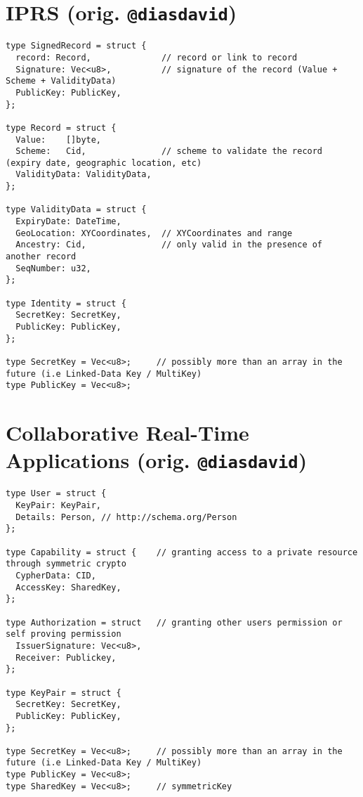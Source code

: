 \documentclass[11pt]{article}
\begin{document}
\newpage
\section{IPRS (orig. \texttt{@diasdavid})}

\begin{lstlisting}
type SignedRecord = struct {
  record: Record,              // record or link to record
  Signature: Vec<u8>,          // signature of the record (Value + Scheme + ValidityData)
  PublicKey: PublicKey,
};

type Record = struct {
  Value:    []byte,
  Scheme:   Cid,               // scheme to validate the record (expiry date, geographic location, etc)
  ValidityData: ValidityData,
};

type ValidityData = struct {
  ExpiryDate: DateTime,
  GeoLocation: XYCoordinates,  // XYCoordinates and range
  Ancestry: Cid,               // only valid in the presence of another record
  SeqNumber: u32,
};

type Identity = struct {
  SecretKey: SecretKey,
  PublicKey: PublicKey,
};

type SecretKey = Vec<u8>;     // possibly more than an array in the future (i.e Linked-Data Key / MultiKey)
type PublicKey = Vec<u8>;
\end{lstlisting}

\newpage
\section{Collaborative Real-Time Applications (orig. \texttt{@diasdavid})}

\begin{lstlisting}
type User = struct {
  KeyPair: KeyPair,
  Details: Person, // http://schema.org/Person
};

type Capability = struct {    // granting access to a private resource through symmetric crypto
  CypherData: CID,
  AccessKey: SharedKey,
};

type Authorization = struct   // granting other users permission or self proving permission
  IssuerSignature: Vec<u8>,
  Receiver: Publickey,
};

type KeyPair = struct {
  SecretKey: SecretKey,
  PublicKey: PublicKey,
};

type SecretKey = Vec<u8>;     // possibly more than an array in the future (i.e Linked-Data Key / MultiKey)
type PublicKey = Vec<u8>;
type SharedKey = Vec<u8>;     // symmetricKey
\end{lstlisting}
\end{document}
